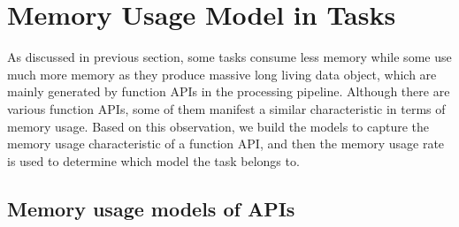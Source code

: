 \section{Memory Usage Model in Tasks}




As discussed in previous section, some tasks consume less memory while some use much more memory as they produce massive long living data object, which are mainly generated by function APIs in the processing pipeline. Although there are various function APIs, some of them manifest a similar characteristic in terms of memory usage. Based on this observation, we build the models to capture the memory usage characteristic of a function API, and then the memory usage rate is used to determine which model the task belongs to.


\subsection{Memory usage models of APIs}

